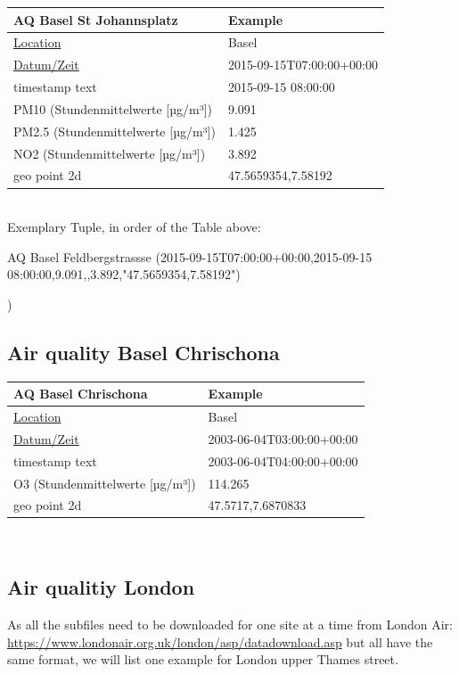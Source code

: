 \documentclass{article}
\begin{document}
\begin{tabular}{ |p{8cm}| p{5cm}| }
\hline
 AQ Basel St Johannsplatz & Example\\
 \hline
  \uline{Location} & Basel\\
 \uline{Datum/Zeit} & 2015-09-15T07:00:00+00:00\\
timestamp text& 2015-09-15 08:00:00 \\
 PM10 (Stundenmittelwerte [µg/m³])&9.091 \\
 PM2.5 (Stundenmittelwerte [µg/m³])& 1.425
\\
 NO2 (Stundenmittelwerte [µg/m³])& 3.892\\
geo point 2d & 47.5659354,7.58192\\
 \hline
\end{tabular}\\

Exemplary Tuple, in order of the Table above:

\begin{tabbing}
    AQ Basel Feldbergstrassse (2015-09-15T07:00:00+00:00,2015-09-15 08:00:00,9.091,,3.892,"47.5659354,7.58192")



)\\
\end{tabbing}

\subsection{Air quality Basel Chrischona}

\begin{tabular}{ |p{8cm}| p{5cm}|  }
\hline
 AQ Basel Chrischona & Example\\
 \hline
  \uline{Location} & Basel\\
 \uline{Datum/Zeit} & 2003-06-04T03:00:00+00:00\\
timestamp text & 2003-06-04T04:00:00+00:00\\
 O3 (Stundenmittelwerte [µg/m³])& 114.265\\
geo point 2d & 47.5717,7.6870833\\
 \hline
\end{tabular}\\


\subsection{Air qualitiy London}

As all the subfiles need to be downloaded for one site at a time from London Air: \url{https://www.londonair.org.uk/london/asp/datadownload.asp} but all have the same format, we will list one example for London upper Thames street.\\
\end{document}
